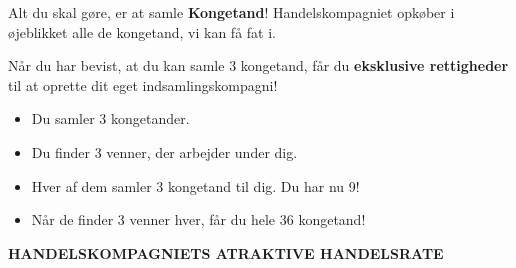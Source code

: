 \documentclass[a4paper,12pt]{memoir}
\begin{document}
\begin{center}
\begin{tcolorbox}
\vspace{0.3em}

Alt du skal gøre, er at samle \textbf{Kongetand}! Handelskompagniet opkøber i øjeblikket alle de kongetand, vi kan få fat i.

\vspace{0.5em}

Når du har bevist, at du kan samle 3 kongetand, får du \textbf{eksklusive rettigheder} til at oprette dit eget indsamlingskompagni!

\vspace{0.7em}

\begin{tcolorbox}[
  enhanced,
  colback=white,
  colframe=Goldenrod!70!black,
  boxrule=0.9pt,
  sharp corners,
  left=5mm,
  right=5mm,
  top=3mm,
  bottom=3mm,
  title={\sffamily\bfseries\large Sådan fungerer det:},
  coltitle=white,
  colbacktitle=Maroon!90!black,
  fonttitle=\sffamily\bfseries
]

\begingroup
\renewcommand{\labelitemi}{%
  \textcolor{Maroon!90!black}{\large\textbullet}%
}
\setlength{\itemsep}{0.45em}

\begin{itemize}
  \item Du samler 3 kongetander.
  \item Du finder 3 venner, der arbejder under dig.
  \item Hver af dem samler 3 kongetand til dig. Du har nu 9!
  \item Når de finder 3 venner hver, får du hele 36 kongetand!
\end{itemize}
\endgroup

\end{tcolorbox}

\vspace{0.7em}

\begin{center}
{\sffamily\bfseries\small\color{Maroon!90!black}
HANDELSKOMPAGNIETS ATRAKTIVE HANDELSRATE}

\vspace{0.25em}

\end{center}


\end{tcolorbox}
\end{center}
\end{document}
